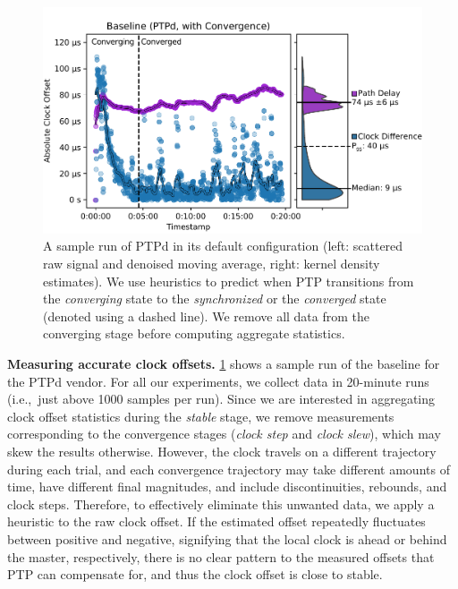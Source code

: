 \begin{figure}
    \includegraphics[width=\linewidth]{res/generated/base/rpi08-convergence_2.pdf}
    \caption{A sample run of PTPd in its default configuration (left: scattered
    raw signal and denoised moving average, right: kernel density estimates).
    We use heuristics to predict when PTP transitions from the
    \textit{converging} state to the \textit{synchronized} or the
    \textit{converged} state (denoted using a dashed line).
    We remove all data from the converging stage before computing aggregate
    statistics.}
    \label{fig:baseline_sample}
\end{figure}

\textbf{Measuring accurate clock offsets.}
\cref{fig:baseline_sample} shows a sample run of the baseline for the
PTPd vendor.
For all our experiments, we collect data in 20-minute runs
(i.e.,~just above 1000 samples per run).
Since we are interested in aggregating clock offset statistics during the
\textit{stable} stage,
we remove measurements corresponding to the convergence stages
(\textit{clock step} and \textit{clock slew}),
which may skew the results otherwise.
However, the clock travels on a different trajectory during each trial,
and each convergence trajectory may take different amounts of time, have
different final magnitudes, and include discontinuities, rebounds, and
clock steps.
Therefore, to effectively eliminate this unwanted data,
we apply a heuristic to the raw clock offset.
If the estimated offset repeatedly fluctuates between positive and negative,
signifying that the local clock is ahead or behind the master, respectively,
there is no clear pattern to the measured offsets that PTP can compensate for,
and thus the clock offset is close to stable.

